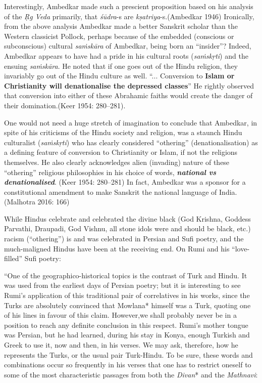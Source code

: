 Interestingly, Ambedkar made such a prescient proposition based on his analysis of the \textit{Ṛg Veda} primarily, that \textit{śūdra}-s are \textit{kṣatriya}-s.\break (Ambedkar 1946) Ironically, from the above analysis Ambedkar made a better Sanskrit scholar than the Western classicist Pollock, perhaps because of the embedded (conscious or subconscious) cultural \textit{saṁskāra} of Ambedkar, being born an “insider”? Indeed, Ambedkar appears to have had a pride in his cultural roots (\textit{saṁskṛti}) and the ensuing \textit{saṁskāra}. He noted that if one goes out of the Hindu religion, they invariably go out of the Hindu culture as well. “... Conversion to \textbf{Islam or Christianity will denationalise the depressed classes}” He rightly observed that conversion into either of these Abrahamic faiths would create the danger of their domination.(Keer 1954: 280–281).

One would not need a huge stretch of imagination to conclude that Ambedkar, in spite of his criticisms of the Hindu society and religion, was a staunch Hindu culturalist (\textit{saṁskṛti}) who has clearly considered “othering” (denationalisation) as a defining feature of conversion to Christianity or Islam, if not the religions themselves. He also clearly acknowledges alien (invading) nature of these “othering” religious philosophies in his choice of words, \textit{\textbf{national vs denationalised}}. (Keer 1954: 280–281) In fact, Ambedkar was a sponsor for a constitutional amendment to make Sanskrit the national language of India. (Malhotra 2016: 166)

While Hindus celebrate and celebrated the divine black (God Krishna, Goddess Parvathi, Draupadi, God Vishnu, all stone idols were and should be black, etc.) racism (“othering”) is and was celebrated in Persian and Sufi poetry, and the much-maligned Hindus have been at the receiving end. On Rumi and his “love-filled” Sufi poetry:

\begin{myquote}
“One of the geographico-historical topics is the contrast of Turk and Hindu. It was used from the earliest days of Persian poetry; but it is interesting to see Rumi's application of this traditional pair of correlatives in his works, since the Turks are absolutely convinced that Mowlana* himself was a Turk, quoting one of his lines in favour of this claim. However,we shall probably never be in a position to reach any definite conclusion in this respect. Rumi's mother tongue was Persian, but he had learned, during his stay in Konya, enough Turkish and Greek to use it, now and then, in his verses. We may ask, therefore, how he represents the Turks, or the usual pair Turk-Hindu. To be sure, these words and combinations occur so frequently in his verses that one has to restrict oneself to some of the most characteristic passages from both the \textit{Divan}* and the \textit{Mathnavi}:
\end{myquote}

